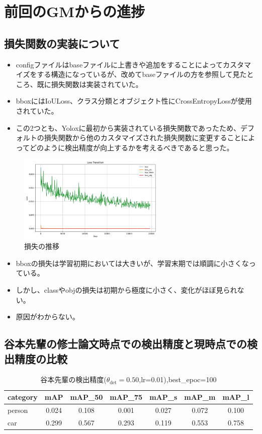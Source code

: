 \documentclass[a4j]{jarticle}
\begin{document}
	\section{前回のGMからの進捗}
	\subsection{損失関数の実装について}
	\begin{itemize}
		\item configファイルはbaseファイルに上書きや追加をすることによってカスタマイズをする構造になっているが、改めてbaseファイルの方を参照して見たところ、既に損失関数は実装されていた。
		\item bboxにはIoULoss、クラス分類とオブジェクト性にCrossEntropyLossが使用されていた。
		\item この2つとも、Yoloxに最初から実装されている損失関数であったため、デフォルトの損失関数から他のカスタマイズされた損失関数に変更することによってどのように検出精度が向上するかを考えるべきであると思った。
	\end{itemize}
	\begin{figure}
		\centering
		\includegraphics[width=7cm]{fig/Loss_graph.png}
		\caption{損失の推移}
	\end{figure}
	\begin{itemize}
		\item bboxの損失は学習初期においては大きいが、学習末期では順調に小さくなっている。
		\item しかし、classやobjの損失は初期から極度に小さく、変化がほぼ見られない。
		\item 原因がわからない。
	\end{itemize}
	\subsection{谷本先輩の修士論文時点での検出精度と現時点での検出精度の比較}
	\begin{table}[htbp]
	\centering
	\caption{谷本先輩の検出精度($\theta_{\mathrm{det}}=0.50$,lr=0.01),best\_epoc=100}
		\begin{tabular}{lcccccc}
			\hline
			\textbf{category} & \textbf{mAP} & \textbf{mAP\_50} & \textbf{mAP\_75} & \textbf{mAP\_s} & \textbf{mAP\_m} & \textbf{mAP\_l} \\
			\hline
			person & 0.024 & 0.108 & 0.001 & 0.027 & 0.072 & 0.100 \\
			car    & 0.299 & 0.567 & 0.293 & 0.119 & 0.553 & 0.758 \\
			\hline
		\end{tabular}
	\end{table}
\end{document}
